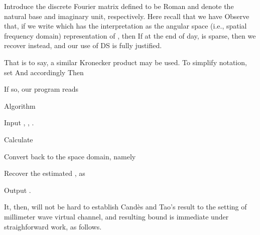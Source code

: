 \stopsection
\startsection [title={Expression for the Angular Space}]

Introduce the discrete Fourier matrix  defined to be
Roman  and  denote the natural base and imaginary unit, respectively.
Here recall that we have
Observe that, if we write
which has the interpretation as the angular space (i.e., spatial frequency domain) representation of , then
If at the end of day,  is sparse, then we recover  instead, and our use of DS is fully justified.

That is to say, a similar Kronecker product may be used.
To simplify notation, set
And accordingly
Then

\stopsection
\startsection [title={Proposed Method}]

If so, our program reads

\Result
{Algorithm}
{
\startitemize[n]
\item Input , , .
\item Calculate
\item Convert  back to the space domain, namely
\item Recover the estimated , as
\item Output .
\stopitemize
}

It, then, will not be hard to establish Cand\`es and Tao's result to the setting of millimeter wave virtual channel, and resulting bound is immediate under straighforward work, as follows.

\stopsection
\stopchapter
